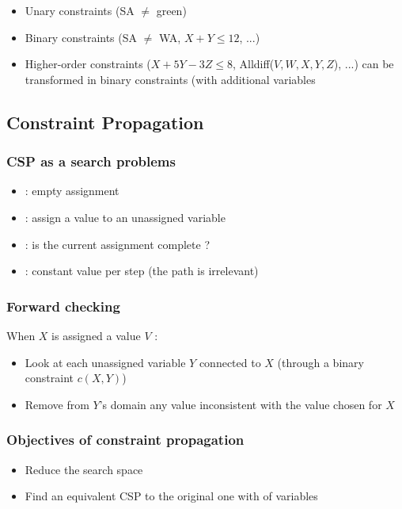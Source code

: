 \begin{itemize}
\item Unary constraints (SA $\neq$ green)
\item Binary constraints (SA $\neq$ WA, $X+Y \leq 12$, ...)
\item Higher-order constraints ($X+5Y-3Z \leq 8$, Alldiff($V,W,X,Y,Z$), ...) can be transformed in binary constraints (with additional variables
\end{itemize}

\subsection{Constraint Propagation}

\subsubsection{CSP as a search problems}

\begin{itemize}
\item {} : empty assignment
\item {} : assign a value to an unassigned variable
\item {} : is the current assignment complete ?
\item {} : constant value per step (the path is irrelevant)
\end{itemize}

\subsubsection{Forward checking}

When $X$ is assigned a value $V$ :
\begin{itemize}
\item Look at each unassigned variable $Y$ connected to $X$ (through a binary constraint $c(X,Y)$)
\item Remove from $Y$'s domain any value inconsistent with the value chosen for $X$
\end{itemize}

\subsubsection{Objectives of constraint propagation}

\begin{itemize}
\item Reduce the search space
\item Find an equivalent CSP to the original one with \textit{} of variables
\end{itemize}

